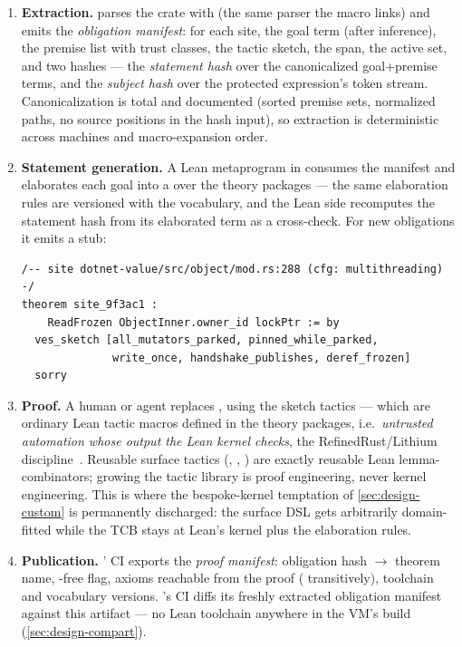 \begin{enumerate}[leftmargin=1.6em]
\item \textbf{Extraction.}  parses the crate
  with  (the same parser the macro links) and emits
  the \emph{obligation manifest}: for each site, the goal term (after
  inference), the premise list with trust classes, the tactic sketch,
  the span, the active  set, and two hashes --- the
  \emph{statement hash} over the canonicalized goal+premise terms, and
  the \emph{subject hash} over the protected expression's token
  stream. Canonicalization is total and documented (sorted premise
  sets, normalized paths, no source positions in the hash input), so
  extraction is deterministic across machines and macro-expansion
  order.
\item \textbf{Statement generation.} A Lean metaprogram in
   consumes the manifest and elaborates each goal into a
   over the theory packages --- the same elaboration rules
  are versioned with the vocabulary, and the Lean side recomputes the
  statement hash from its elaborated term as a cross-check. For new
  obligations it emits a stub:
\begin{lstlisting}[language=Lean]
/-- site dotnet-value/src/object/mod.rs:288 (cfg: multithreading) -/
theorem site_9f3ac1 :
    ReadFrozen ObjectInner.owner_id lockPtr := by
  ves_sketch [all_mutators_parked, pinned_while_parked,
              write_once, handshake_publishes, deref_frozen]
  sorry
\end{lstlisting}
\item \textbf{Proof.} A human or agent replaces , using
  the sketch tactics --- which are ordinary Lean tactic macros defined
  in the theory packages, i.e.\ \emph{untrusted automation whose
  output the Lean kernel checks}, the RefinedRust/Lithium
  discipline~\cite{refinedrust2024}. Reusable surface tactics
  (, , ) are exactly
  reusable Lean lemma-combinators; growing the tactic library is
  proof engineering, never kernel engineering. This is where the
  bespoke-kernel temptation of \cref{sec:design-custom} is
  permanently discharged: the surface DSL gets arbitrarily
  domain-fitted while the TCB stays at Lean's kernel plus the
  elaboration rules.
\item \textbf{Publication.} ' CI exports the
  \emph{proof manifest}: obligation hash $\to$ theorem name,
  -free flag, axioms reachable from the proof
  ( transitively), toolchain and vocabulary
  versions. \dotnetrs{}'s CI diffs its freshly extracted obligation
  manifest against this artifact --- no Lean toolchain anywhere in the
  VM's build (\cref{sec:design-compart}).
\end{enumerate}

